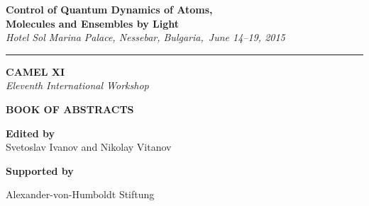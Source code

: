 \thispagestyle{empty}



\begin{center}

{\LARGE \textsf{\textbf{Control of Quantum Dynamics of Atoms,}\\ \vspace{2mm} \textbf{Molecules and Ensembles by Light} }}\\ \vspace{2mm}
{\Large \emph{Hotel Sol Marina Palace, Nessebar, Bulgaria,\ June 14--19, 2015}}

\vspace{3mm}

\hrule

\vspace{25mm}

{\fontsize{40}{48}\selectfont \textsf{\textbf{CAMEL XI}}}\\
\vspace{5mm}
{\LARGE \emph{Eleventh International Workshop}}\\

\vspace{25mm}

{\fontsize{36}{40}\selectfont \textsf{\textbf{BOOK OF  ABSTRACTS}}}\\

\vspace{15mm}

\Large{\textbf{Edited by} \\ Svetoslav Ivanov and Nikolay Vitanov}

\vspace{60mm}

{\Large \textbf{Supported by}

Alexander-von-Humboldt Stiftung

}




\end{center}

